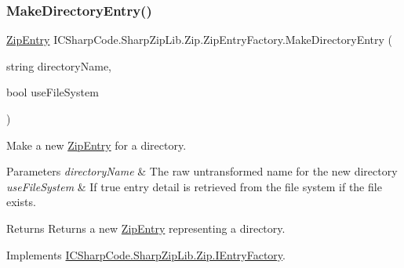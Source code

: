 \mbox{\label{class_i_c_sharp_code_1_1_sharp_zip_lib_1_1_zip_1_1_zip_entry_factory_a9fcaf5dd4ef695b41c6203a8f1e4d119}} 
\subsubsection{\texorpdfstring{Make\+Directory\+Entry()}{MakeDirectoryEntry()}\hspace{0.1cm}{\footnotesize\ttfamily [2/2]}}
{\footnotesize\ttfamily \hyperlink{class_i_c_sharp_code_1_1_sharp_zip_lib_1_1_zip_1_1_zip_entry}{Zip\+Entry} I\+C\+Sharp\+Code.\+Sharp\+Zip\+Lib.\+Zip.\+Zip\+Entry\+Factory.\+Make\+Directory\+Entry (\begin{DoxyParamCaption}\item[{string}]{directory\+Name,  }\item[{bool}]{use\+File\+System }\end{DoxyParamCaption})\hspace{0.3cm}{\ttfamily [inline]}}



Make a new \hyperlink{class_i_c_sharp_code_1_1_sharp_zip_lib_1_1_zip_1_1_zip_entry}{Zip\+Entry} for a directory. 


\begin{DoxyParams}{Parameters}
{\em directory\+Name} & The raw untransformed name for the new directory\\
\hline
{\em use\+File\+System} & If true entry detail is retrieved from the file system if the file exists.\\
\hline
\end{DoxyParams}
\begin{DoxyReturn}{Returns}
Returns a new \hyperlink{class_i_c_sharp_code_1_1_sharp_zip_lib_1_1_zip_1_1_zip_entry}{Zip\+Entry} representing a directory.
\end{DoxyReturn}


Implements \hyperlink{interface_i_c_sharp_code_1_1_sharp_zip_lib_1_1_zip_1_1_i_entry_factory_ac2cf6ab63aab27361bb3f186ee78b00d}{I\+C\+Sharp\+Code.\+Sharp\+Zip\+Lib.\+Zip.\+I\+Entry\+Factory}.

